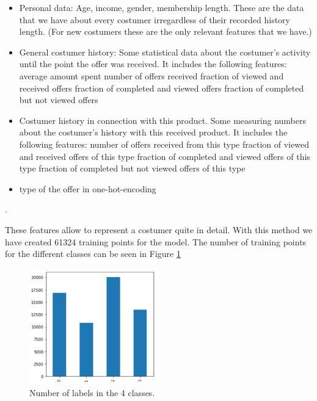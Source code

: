 \begin{itemize}
	\item Personal data: Age, income, gender, membership length. These are the data that we have about every costumer irregardless of their recorded history length. (For new costumers these are the only relevant features that we have.)
	\item General costumer history: Some statistical data about the costumer's activity until the point the offer was received. It includes the following features:
		\subitem average amount spent
		\subitem number of offers received
		\subitem fraction of viewed and received offers
		\subitem fraction of completed and viewed offers
		\subitem fraction of completed but not viewed offers
	\item Costumer history in connection with this product. Some measuring numbers about the costumer's history with this received product. It includes the following features:
		\subitem number of offers received from this type
		\subitem fraction of viewed and received offers of this type
		\subitem fraction of completed and viewed offers of this type
		\subitem fraction of completed but not viewed offers of this type
	\item type of the offer in one-hot-encoding
\end{itemize}.

These features allow to represent a costumer quite in detail. With this method we have created 61324 training points for the model. The number of training points for the different classes can be seen in Figure \ref{fig11}

\begin{figure}[h]
	\centering
	\includegraphics[width=0.5\textwidth]{fig/num_labels.jpg}
	\vspace*{-0.1in}
	\caption{Number of labels in the 4 classes.}
	\label{fig11}
	\vspace*{-0.2in}
	\bigskip
\end{figure}

